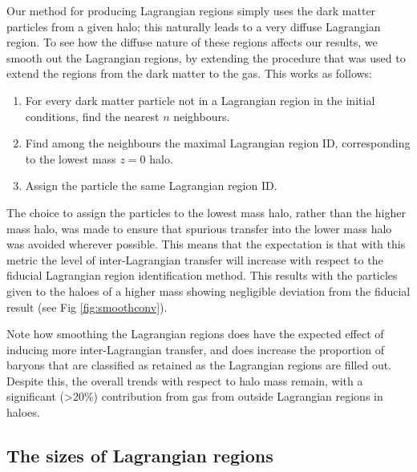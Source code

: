 \documentclass[fleqn,usenatbib]{mnras}
\begin{document}
Our method for producing Lagrangian regions simply uses the dark matter
particles from a given halo; this naturally leads to a very diffuse
Lagrangian region. To see how the diffuse nature of these regions affects our
results, we smooth out the Lagrangian regions, by extending the procedure
that was used to extend the regions from the dark matter to the gas. This
works as follows:
\begin{enumerate}
	\item For every dark matter particle not in a Lagrangian region 
	      in the initial conditions, find the nearest $n$ neighbours.
	\item Find among the neighbours the maximal Lagrangian region ID,
	      corresponding to the lowest mass $z=0$ halo.
	\item Assign the particle the same Lagrangian region ID.
\end{enumerate}
The choice to assign the particles to the lowest mass halo, rather than the
higher mass halo, was made to ensure that spurious transfer into the lower mass
halo was avoided wherever possible. This means that the expectation is that
with this metric the level of inter-Lagrangian transfer will increase with
respect to the fiducial Lagrangian region identification method. This results
with the particles given to the haloes of a higher mass showing negligible
deviation from the fiducial result (see Fig \ref{fig:smoothconv}).


Note how smoothing the Lagrangian regions does have the expected effect of
inducing more inter-Lagrangian transfer, and does increase the proportion of
baryons that are classified as retained as the Lagrangian regions are filled
out. Despite this, the overall trends with respect to halo mass remain, with
a significant (>20\%) contribution from gas from outside Lagrangian regions
in haloes.

\subsection{The sizes of Lagrangian regions}
\end{document}
